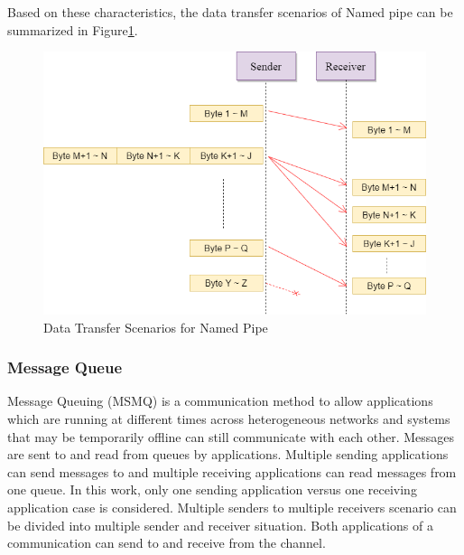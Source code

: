 Based on these characteristics, the data transfer scenarios of Named pipe can be summarized in Figure\ref{namedpipe}. 
\begin{figure}[H]
\centerline{\includegraphics[scale=0.48]{Figures/namedpipe}}
\caption{Data Transfer Scenarios for Named Pipe}
\label{namedpipe}
\end{figure}

\subsubsection{Message Queue}
Message Queuing (MSMQ) is a communication method to allow applications which are running at different times across heterogeneous networks and systems that may be temporarily offline can still communicate with each other. Messages are sent to and read from queues by applications. Multiple sending applications can send messages to and multiple receiving applications can read messages from one queue.\cite{redkar2004pro} In this work, only one sending application versus one receiving application case is considered. Multiple senders to multiple receivers scenario can be divided into multiple sender and receiver situation. Both applications of a communication can send to and receive from the channel.

